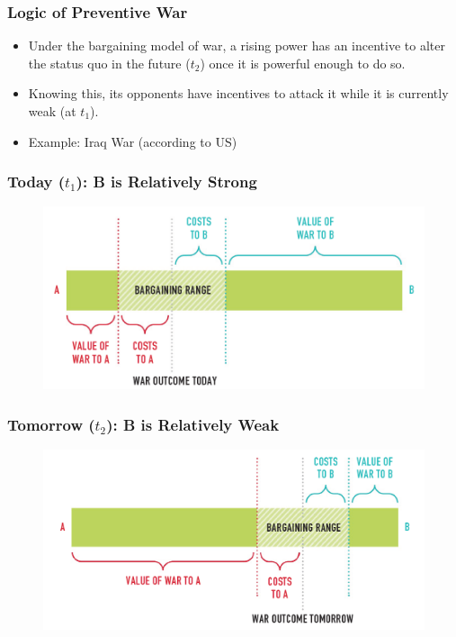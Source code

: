 \documentclass[handout]{beamer}
\begin{document}
\begin{frame} 
	\frametitle{\LARGE{Logic of Preventive War}}
	\begin{itemize}
		\item Under the bargaining model of war, a rising power has an incentive to alter the status quo in the future ($t_2$) once it is powerful enough to do so. \pause
		\item Knowing this, its opponents have incentives to attack it while it is currently weak (at $t_1$). \pause 
		\item Example: Iraq War (according to US)
	\end{itemize}
\end{frame}

\begin{frame} 
	\frametitle{\LARGE{Today ($t_1$): B is Relatively Strong}}
	\begin{figure}[ht!]
		\centering
		\includegraphics[width=\textwidth,height=0.8\textheight,keepaspectratio]{./cred1.png}
	\end{figure}
\end{frame}

\begin{frame} 
	\frametitle{\LARGE{Tomorrow ($t_2$): B is Relatively Weak}}
	\begin{figure}[ht!]
		\centering
		\includegraphics[width=\textwidth,height=0.8\textheight,keepaspectratio]{./cred2.png}
	\end{figure}
\end{frame}
\end{document}
